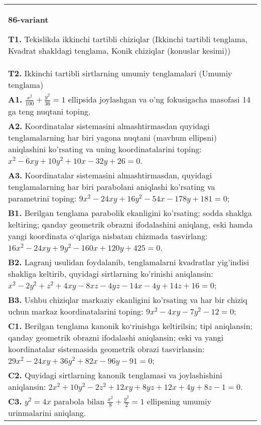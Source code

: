 \documentclass{article}
\begin{document}
\begin{tabular}{m{17cm}}
\textbf{86-variant}
\newline

\textbf{T1.} Tekislikda ikkinchi tartibli chiziqlar (Ikkinchi tartibli tenglama, Kvadrat shakldagi tenglama, Konik chiziqlar (konuslar kesimi)) \\
\textbf{T2.} Ikkinchi tartibli sirtlarning umumiy tenglamalari (Umumiy tenglama) \\
\textbf{A1.} $\frac{x^2}{100}+\frac{y^2}{36}=1$ ellipsida joylashgan va o'ng fokusigacha masofasi 14 ga teng nuqtani toping. \\
\textbf{A2.} Koordinatalar sistemasini almashtirmasdan quyidagi tenglamalarning har biri yagona nuqtani (mavhum ellipsni) aniqlashini ko'rsating va uning koordinatalarini toping: $x^2-6 x y+10 y^2+10 x-32 y+26=0$. \\
\textbf{A3.} Koordinatalar sistemasini almashtirmasdan, quyidagi tenglamalarning har biri parabolani aniqlashi ko'rsating va parametrini toping: $9 x^2-24 x y+16 y^2-54 x-178 y+181=0$; \\
\textbf{B1.} Berilgan tenglama parabolik ekanligini ko'rsating; sodda shaklga keltiring; qanday geometrik obrazni ifodalashini aniqlang, eski hamda yangi koordinata o‘qlariga nisbatan chizmada tasvirlang: $16 x^2-24 x y+9 y^2-160 x+120 y+425=0$. \\
\textbf{B2.} Lagranj usulidan foydalanib, tenglamalarni kvadratlar yig'indisi shakliga keltirib, quyidagi sirtlarning ko'rinishi aniqlansin: $x^2-2 y^2+z^2+4 x y-8 x z-4 y z-14 x-4 y+14 z+16=0$; \\
\textbf{B3.} Ushbu chiziqlar markaziy ekanligini ko'rsating va har bir chiziq uchun markaz koordinatalarini toping: $9 x^2-4 x y-7 y^2-12=0$; \\
\textbf{C1.} Berilgan tenglama kanonik ko‘rinishga keltirilsin; tipi aniqlansin; qanday geometrik obrazni ifodalashi aniqlansin; eski va yangi koordinatalar sistemasida geometrik obrazi tasvirlansin: $29 x^2-24 x y+36 y^2+82 x-96 y-91=0$; \\
\textbf{C2.} Quyidagi sirtlarning kanonik tenglamasi va joylashishini aniqlansin: $2 x^2+10 y^2-2 z^2+12 x y+8 y z+12 x+4 y+8 z-1=0$. \\
\textbf{C3.} $y^2=4 x$ parabola bilan $\frac{x^2}{8}+\frac{y^2}{2}=1$ ellipsning umumiy urinmalarini aniqlang. \\

\end{tabular}
\vspace{1cm}
\end{document}
